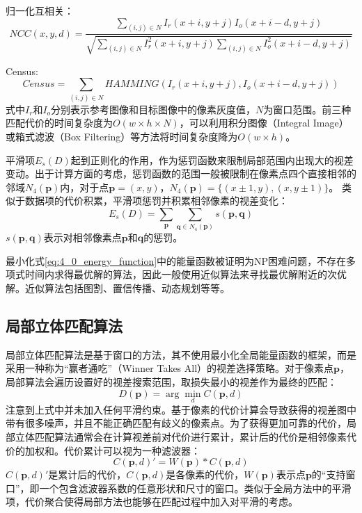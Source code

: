 归一化互相关：
\[ NCC(x,y,d) = \frac{\sum_{(i,j)\in N} I_r(x+i, y+j)  I_o(x+i-d, y+j) }
{\sqrt   {\sum_{(i,j) \in N} I_r^2(x+i,y+j)  \sum_ {(i,j) \in N} I_o^2(x+i-d, y+j) } }  \]

Census:
\[  Census = \sum_ {(i,j) \in N} HAMMING(I_r(x+i,y+j), I_o(x+i-d, y+j))   \]
式中$I_r$和$I_o$分别表示参考图像和目标图像中的像素灰度值，$N$为窗口范围。前三种匹配代价的时间复杂度为$O(w\times h \times N)$，可以利用积分图像（Integral Image）或箱式滤波（Box Filtering）等方法将时间复杂度降为$O(w \times h)$。

平滑项$E_s(D)$起到正则化的作用，作为惩罚函数来限制局部范围内出现大的视差变动。出于计算方面的考虑，惩罚函数的范围一般被限制在像素点四个直接相邻的邻域$N_4(\mathbf{p})$内，对于点$\mathbf{p}=(x,y)$，$N_4(\mathbf{p}) = \{ (x \pm 1, y), (x, y \pm 1) \}$。 类似于数据项的代价积累，平滑项惩罚并积累相邻像素的视差变化：
\[  E_s(D) = \sum_{\mathbf{p}} \sum_{\mathbf{q} \in N_4(\mathbf{p})} s(\mathbf{p}, \mathbf{q})    \]
$s(\mathbf{p}, \mathbf{q})$表示对相邻像素点$\mathbf{p}$和$\mathbf{q}$的惩罚。

最小化式\ref{eq:4_0_energy_function}中的能量函数被证明为NP困难问题\cite{boykov2001fast}，不存在多项式时间内求得最优解的算法，因此一般使用近似算法来寻找最优解附近的次优解。近似算法包括图割\cite{boykov2001fast}、置信传播\cite{sun2003stereo}、动态规划\cite{VanMeerbergen2002}等等。

\subsection{局部立体匹配算法}
局部立体匹配算法是基于窗口的方法，其不使用最小化全局能量函数的框架，而是采用一种称为“赢者通吃”（Winner Takes All）的视差选择策略。对于像素点$\mathbf{p}$，局部算法会遍历设置好的视差搜索范围，取损失最小的视差作为最终的匹配：
%
\begin{equation} \label{eq:4_0_local_WTA}
D(\mathbf{p}) = \arg \min_d C(\mathbf{p}, d)
\end{equation}
注意到上式中并未加入任何平滑约束。基于像素的代价计算会导致获得的视差图中带有很多噪声，并且不能正确匹配有歧义的像素点。为了获得更加可靠的代价，局部立体匹配算法通常会在计算视差前对代价进行累计，累计后的代价是相邻像素代价的加权和。代价累计可以视为一种滤波器：
%
\begin{equation} \label{eq:4_0_local_cost_aggregation}
C(\mathbf{p}, d)' = W(\mathbf{p}) * C(\mathbf{p}, d)
\end{equation}
$C(\mathbf{p}, d)' $是累计后的代价，$C(\mathbf{p}, d)$是各像素的代价，$W(\mathbf{p})$表示点$\mathbf{p}$的“支持窗口”，即一个包含滤波器系数的任意形状和尺寸的窗口。类似于全局方法中的平滑项，代价聚合使得局部方法也能够在匹配过程中加入对平滑的考虑。

